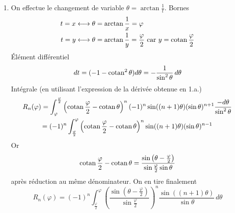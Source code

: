 \begin{enumerate}
 \item On effectue le changement de variable $\theta = \arctan \frac{1}{t}$.\newline
Bornes
\begin{align*}
 t=x &\longleftrightarrow \theta =\arctan \frac{1}{x}=\varphi \\
 t=y &\longleftrightarrow \theta =\arctan \frac{1}{y}=\frac{\varphi}{2} \text{ car }y=\operatorname{cotan}\frac{\varphi}{2}
\end{align*}
\'Elément différentiel
\begin{displaymath}
 dt=(-1-\operatorname{cotan}^2 \theta)d\theta = -\frac{1}{\sin^2\theta}\,d\theta 
\end{displaymath}
Intégrale (en utilisant l'expression de la dérivée obtenue en 1.a.)
\begin{multline*}
 R_n(\varphi)=
\int_\varphi^{\frac{\varphi}{2}}\left(\operatorname{cotan}\frac{\varphi}{2}-\operatorname{cotan} \theta \right)^n (-1)^n \sin((n+1)\theta)(\sin \theta)^{n+1}\frac{-d\theta}{\sin^2\theta}\\
=(-1)^n\int_{\frac{\varphi}{2}}^\varphi\left(\operatorname{cotan}\frac{\varphi}{2}-\operatorname{cotan} \theta \right)^n\sin((n+1)\theta)(\sin \theta)^{n-1}
\end{multline*}
Or
\begin{displaymath}
 \operatorname{cotan}\frac{\varphi}{2}-\operatorname{cotan} \theta = \frac{\sin\left(\theta-\frac{\varphi}{2} \right) }{\sin\frac{\varphi}{2} \sin \theta}
\end{displaymath}
après réduction au même dénominateur. On en tire finalement
\begin{displaymath}
 R_n(\varphi)=
(-1)^n\int_{\frac{\varphi}{2}}^\varphi
\left(\frac{\sin\left(\theta-\frac{\varphi}{2} \right) }{\sin\frac{\varphi}{2}} \right)^n\frac{\sin((n+1)\theta)}{\sin \theta}\, d\theta 
\end{displaymath}

\end{enumerate}

